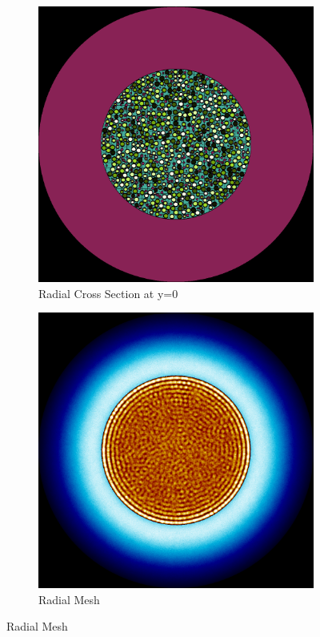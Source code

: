 \begin{figure}[H]
\centering

\begin{subfigure}{0.45\textwidth}
  \includegraphics[width=0.95\linewidth]{figures/2345601/2345601-r}
  \caption{Radial Cross Section at y=0}
  \label{fig:2345601-r}
\end{subfigure}%
%
\begin{subfigure}{0.45\textwidth}
  \includegraphics[width=0.95\linewidth]{figures/2345601/2345601-rm}
  \caption{Radial Mesh}
  \label{fig:2345601-rm}
\end{subfigure}


\end{figure}
